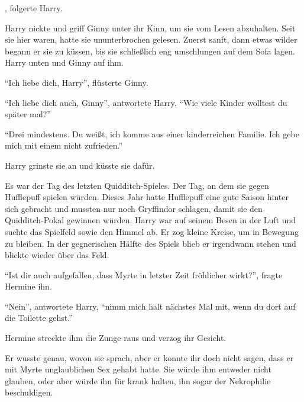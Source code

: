 , folgerte Harry.






Harry nickte und griff Ginny unter ihr Kinn, um sie vom Lesen abzuhalten. Seit sie hier waren, hatte sie ununterbrochen gelesen. Zuerst sanft, dann etwas wilder begann er sie zu küssen, bis sie schließlich eng umschlungen auf dem Sofa lagen. Harry unten und Ginny auf ihm.

\enquote{Ich liebe dich, Harry}, flüsterte Ginny.

\enquote{Ich liebe dich auch, Ginny}, antwortete Harry. \enquote{Wie viele Kinder wolltest du später mal?}

\enquote{Drei mindestens. Du weißt, ich komme aus einer kinderreichen Familie. Ich gebe mich mit einem nicht zufrieden.}

Harry grinste sie an und küsste sie dafür.

\trenn

Es war der Tag des letzten Quidditch-Spieles. Der Tag, an dem sie gegen Hufflepuff spielen würden. Dieses Jahr hatte Hufflepuff eine gute Saison hinter sich gebracht und mussten nur noch Gryffindor schlagen, damit sie den Quidditch-Pokal gewinnen würden. Harry war auf seinem Besen in der Luft und suchte das Spielfeld sowie den Himmel ab. Er zog kleine Kreise, um in Bewegung zu bleiben. In der gegnerischen Hälfte des Spiels blieb er irgendwann stehen und blickte wieder über das Feld.

\begin{rueckblick}
\enquote{Ist dir auch aufgefallen, dass Myrte in letzter Zeit fröhlicher wirkt?}, fragte Hermine ihn.

\enquote{Nein}, antwortete Harry, \enquote{nimm mich halt nächstes Mal mit, wenn du dort auf die Toilette gehst.}

Hermine streckte ihm die Zunge raus und verzog ihr Gesicht.

Er wusste genau, wovon sie sprach, aber er konnte ihr doch nicht sagen, dass er mit Myrte unglaublichen Sex gehabt hatte. Sie würde ihm entweder nicht glauben, oder aber würde ihn für krank halten, ihn sogar der Nekrophilie beschuldigen.
\end{rueckblick}

